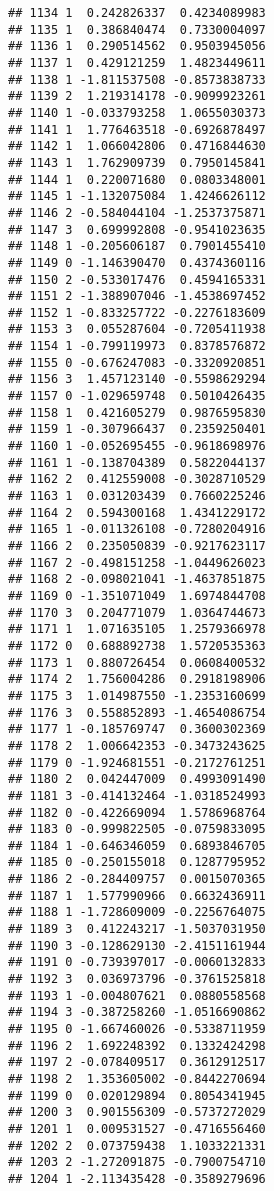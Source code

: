 \documentclass[
]{article}
\begin{document}
\begin{verbatim}
## 1134 1  0.242826337  0.4234089983
## 1135 1  0.386840474  0.7330004097
## 1136 1  0.290514562  0.9503945056
## 1137 1  0.429121259  1.4823449611
## 1138 1 -1.811537508 -0.8573838733
## 1139 2  1.219314178 -0.9099923261
## 1140 1 -0.033793258  1.0655030373
## 1141 1  1.776463518 -0.6926878497
## 1142 1  1.066042806  0.4716844630
## 1143 1  1.762909739  0.7950145841
## 1144 1  0.220071680  0.0803348001
## 1145 1 -1.132075084  1.4246626112
## 1146 2 -0.584044104 -1.2537375871
## 1147 3  0.699992808 -0.9541023635
## 1148 1 -0.205606187  0.7901455410
## 1149 0 -1.146390470  0.4374360116
## 1150 2 -0.533017476  0.4594165331
## 1151 2 -1.388907046 -1.4538697452
## 1152 1 -0.833257722 -0.2276183609
## 1153 3  0.055287604 -0.7205411938
## 1154 1 -0.799119973  0.8378576872
## 1155 0 -0.676247083 -0.3320920851
## 1156 3  1.457123140 -0.5598629294
## 1157 0 -1.029659748  0.5010426435
## 1158 1  0.421605279  0.9876595830
## 1159 1 -0.307966437  0.2359250401
## 1160 1 -0.052695455 -0.9618698976
## 1161 1 -0.138704389  0.5822044137
## 1162 2  0.412559008 -0.3028710529
## 1163 1  0.031203439  0.7660225246
## 1164 2  0.594300168  1.4341229172
## 1165 1 -0.011326108 -0.7280204916
## 1166 2  0.235050839 -0.9217623117
## 1167 2 -0.498151258 -1.0449626023
## 1168 2 -0.098021041 -1.4637851875
## 1169 0 -1.351071049  1.6974844708
## 1170 3  0.204771079  1.0364744673
## 1171 1  1.071635105  1.2579366978
## 1172 0  0.688892738  1.5720535363
## 1173 1  0.880726454  0.0608400532
## 1174 2  1.756004286  0.2918198906
## 1175 3  1.014987550 -1.2353160699
## 1176 3  0.558852893 -1.4654086754
## 1177 1 -0.185769747  0.3600302369
## 1178 2  1.006642353 -0.3473243625
## 1179 0 -1.924681551 -0.2172761251
## 1180 2  0.042447009  0.4993091490
## 1181 3 -0.414132464 -1.0318524993
## 1182 0 -0.422669094  1.5786968764
## 1183 0 -0.999822505 -0.0759833095
## 1184 1 -0.646346059  0.6893846705
## 1185 0 -0.250155018  0.1287795952
## 1186 2 -0.284409757  0.0015070365
## 1187 1  1.577990966  0.6632436911
## 1188 1 -1.728609009 -0.2256764075
## 1189 3  0.412243217 -1.5037031950
## 1190 3 -0.128629130 -2.4151161944
## 1191 0 -0.739397017 -0.0060132833
## 1192 3  0.036973796 -0.3761525818
## 1193 1 -0.004807621  0.0880558568
## 1194 3 -0.387258260 -1.0516690862
## 1195 0 -1.667460026 -0.5338711959
## 1196 2  1.692248392  0.1332424298
## 1197 2 -0.078409517  0.3612912517
## 1198 2  1.353605002 -0.8442270694
## 1199 0  0.020129894  0.8054341945
## 1200 3  0.901556309 -0.5737272029
## 1201 1  0.009531527 -0.4716556460
## 1202 2  0.073759438  1.1033221331
## 1203 2 -1.272091875 -0.7900754710
## 1204 1 -2.113435428 -0.3589279696

\end{verbatim}
\end{document}
